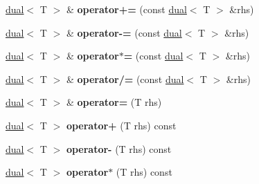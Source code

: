 \begin{DoxyCompactItemize}
\item 
\hypertarget{struct_d_r_d_s_p_1_1dual_af928d72c558bc5251f48e3a8ef43e499}{\hyperlink{struct_d_r_d_s_p_1_1dual}{dual}$<$ T $>$ \& {\bfseries operator+=} (const \hyperlink{struct_d_r_d_s_p_1_1dual}{dual}$<$ T $>$ \&rhs)}\label{struct_d_r_d_s_p_1_1dual_af928d72c558bc5251f48e3a8ef43e499}

\item 
\hypertarget{struct_d_r_d_s_p_1_1dual_aeea91211e526cfd1ff76dd99228045fa}{\hyperlink{struct_d_r_d_s_p_1_1dual}{dual}$<$ T $>$ \& {\bfseries operator-\/=} (const \hyperlink{struct_d_r_d_s_p_1_1dual}{dual}$<$ T $>$ \&rhs)}\label{struct_d_r_d_s_p_1_1dual_aeea91211e526cfd1ff76dd99228045fa}

\item 
\hypertarget{struct_d_r_d_s_p_1_1dual_a5bdcc4cd454cd6b3a775d0e3ac9de853}{\hyperlink{struct_d_r_d_s_p_1_1dual}{dual}$<$ T $>$ \& {\bfseries operator$\ast$=} (const \hyperlink{struct_d_r_d_s_p_1_1dual}{dual}$<$ T $>$ \&rhs)}\label{struct_d_r_d_s_p_1_1dual_a5bdcc4cd454cd6b3a775d0e3ac9de853}

\item 
\hypertarget{struct_d_r_d_s_p_1_1dual_a68be03e1a9a0ae79edbcb1b012b4567b}{\hyperlink{struct_d_r_d_s_p_1_1dual}{dual}$<$ T $>$ \& {\bfseries operator/=} (const \hyperlink{struct_d_r_d_s_p_1_1dual}{dual}$<$ T $>$ \&rhs)}\label{struct_d_r_d_s_p_1_1dual_a68be03e1a9a0ae79edbcb1b012b4567b}

\item 
\hypertarget{struct_d_r_d_s_p_1_1dual_ac694c41d16a43f1a563d03dfda4cd7de}{\hyperlink{struct_d_r_d_s_p_1_1dual}{dual}$<$ T $>$ \& {\bfseries operator=} (T rhs)}\label{struct_d_r_d_s_p_1_1dual_ac694c41d16a43f1a563d03dfda4cd7de}

\item 
\hypertarget{struct_d_r_d_s_p_1_1dual_a4eb044a0ca3c544d3523154fc29a76f3}{\hyperlink{struct_d_r_d_s_p_1_1dual}{dual}$<$ T $>$ {\bfseries operator+} (T rhs) const }\label{struct_d_r_d_s_p_1_1dual_a4eb044a0ca3c544d3523154fc29a76f3}

\item 
\hypertarget{struct_d_r_d_s_p_1_1dual_a44e440e0b29008ac9363c5421ffcdd42}{\hyperlink{struct_d_r_d_s_p_1_1dual}{dual}$<$ T $>$ {\bfseries operator-\/} (T rhs) const }\label{struct_d_r_d_s_p_1_1dual_a44e440e0b29008ac9363c5421ffcdd42}

\item 
\hypertarget{struct_d_r_d_s_p_1_1dual_a7c1a8b272bbdfcae34f0fa92af793e50}{\hyperlink{struct_d_r_d_s_p_1_1dual}{dual}$<$ T $>$ {\bfseries operator$\ast$} (T rhs) const }\label{struct_d_r_d_s_p_1_1dual_a7c1a8b272bbdfcae34f0fa92af793e50}


\end{DoxyCompactItemize}
